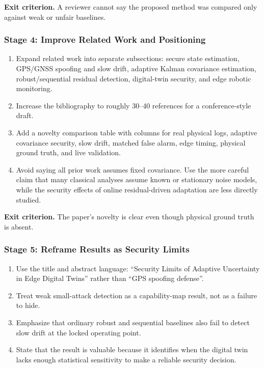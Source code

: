 \textbf{Exit criterion.} A reviewer cannot say the proposed method was
compared only against weak or unfair baselines.

\subsubsection{Stage 4: Improve Related Work and Positioning}

\begin{enumerate}
    \item Expand related work into separate subsections:
    secure state estimation, GPS/GNSS spoofing and slow drift, adaptive Kalman
    covariance estimation, robust/sequential residual detection, digital-twin
    security, and edge robotic monitoring.

    \item Increase the bibliography to roughly 30--40 references for a
    conference-style draft.

    \item Add a novelty comparison table with columns for real physical logs,
    adaptive covariance security, slow drift, matched false alarm, edge
    timing, physical ground truth, and live validation.

    \item Avoid saying all prior work assumes fixed covariance. Use the more
    careful claim that many classical analyses assume known or stationary
    noise models, while the security effects of online residual-driven
    adaptation are less directly studied.
\end{enumerate}

\textbf{Exit criterion.} The paper's novelty is clear even though physical
ground truth is absent.

\subsubsection{Stage 5: Reframe Results as Security Limits}

\begin{enumerate}
    \item Use the title and abstract language:
    ``Security Limits of Adaptive Uncertainty in Edge Digital Twins'' rather
    than ``GPS spoofing defense''.

    \item Treat weak small-attack detection as a capability-map result, not as
    a failure to hide.

    \item Emphasize that ordinary robust and sequential baselines also fail to
    detect slow drift at the locked operating point.

    \item State that the result is valuable because it identifies when the
    digital twin lacks enough statistical sensitivity to make a reliable
    security decision.
\end{enumerate}

